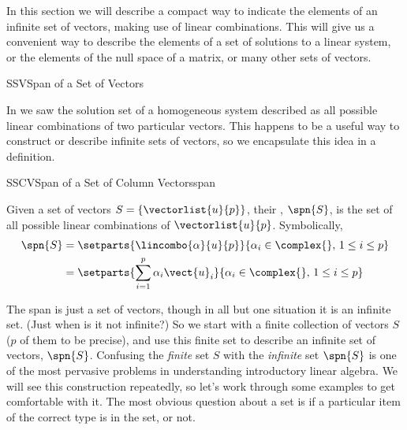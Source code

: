 %
\begin{introduction}
\begin{para}In this section we will describe a compact way to indicate the elements of an infinite set of vectors, making use of linear combinations.  This will give us a convenient way to describe the elements of a set of solutions to a linear system, or the elements of the null space of a matrix, or many other sets of vectors.\end{para}
\end{introduction}
%
\begin{subsect}{SSV}{Span of a Set of Vectors}
%
\begin{para}In  we saw the solution set of a homogeneous system described as all possible linear combinations of two particular vectors.  This happens to be a useful way to construct or describe infinite sets of vectors, so we encapsulate this idea in a definition.\end{para}
%
%
\begin{definition}{SSCV}{Span of a Set of Column Vectors}{span}
\begin{para}Given a set of vectors $S=\{\vectorlist{u}{p}\}$, their , $\spn{S}$, is the set of all possible linear combinations of $\vectorlist{u}{p}$.  Symbolically,
%
\begin{align*}
\spn{S}&=\setparts{\lincombo{\alpha}{u}{p}}{\alpha_i\in\complex{\null},\,1\leq i\leq p}\\
&=\setparts{\sum_{i=1}^{p}\alpha_i\vect{u}_i}{\alpha_i\in\complex{\null},\,1\leq i\leq p}
\end{align*}
\end{para}
%
\end{definition}
%
\begin{para}The span is just a set of vectors, though in all but one situation it is an infinite set.  (Just when is it not infinite?)  So we start with a finite collection of vectors $S$ ($p$ of them to be precise), and use this finite set to describe an infinite set of vectors, $\spn{S}$.  Confusing the {\em finite} set $S$ with the {\em infinite} set $\spn{S}$ is one of the most pervasive problems in understanding introductory linear algebra.  We will see this construction repeatedly, so let's work through some examples to get comfortable with it.  The most obvious question about a set is if a particular item of the correct type is in the set, or not.\end{para}

\end{subsect}
